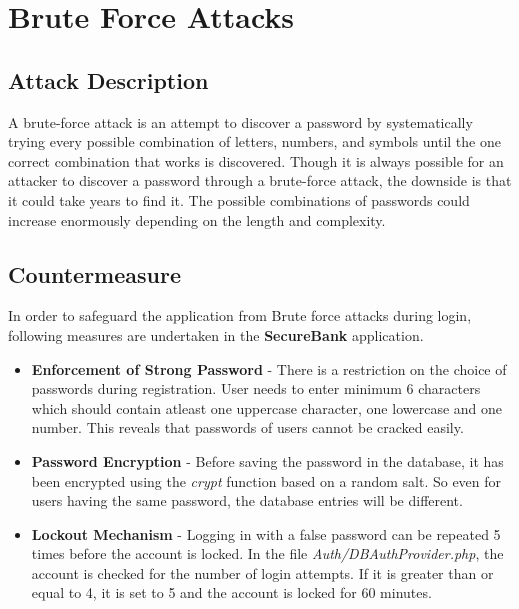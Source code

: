 \section{Brute Force Attacks}

\subsection{Attack Description}
A brute-force attack is an attempt to discover a password by systematically trying every possible combination of letters, numbers, and symbols until the one correct combination that works is discovered.
Though it is always possible for an attacker to discover a password through a brute-force attack, the downside is that it could take years to find it. The possible combinations of passwords could increase enormously depending on the length and complexity. 

\subsection{Countermeasure}
In order to safeguard the application from Brute force attacks during login, following measures are undertaken in the \textbf{SecureBank} application.

\begin{itemize}
\item \textbf{Enforcement of Strong Password} - There is a restriction on the choice of passwords during registration. User needs to enter minimum 6 characters
which should contain atleast one uppercase character, one lowercase and one number. This reveals that passwords of users cannot be cracked easily.

\item \textbf{Password Encryption} - Before saving the password in the database, it has been encrypted using the \textit{crypt} function based on a random salt. So
even for users having the same password, the database entries will be different.

\item \textbf{Lockout Mechanism} - Logging in with a false password can be repeated 5 times before the
account is locked. In the file \textit{Auth/DBAuthProvider.php}, the account is checked for the number of login attempts. If it is greater than or equal to 4, it is set to 5 and the account is locked for 60 minutes.
\end{itemize}

\clearpage